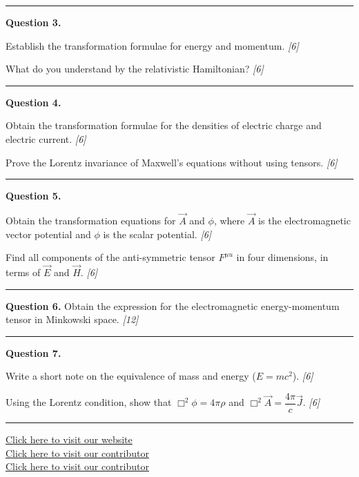 \documentclass[11pt,a4paper]{article}
\newcommand{\pts}[1]{\hfill   \textit{[#1]}}
\begin{document}
\medskip\rule{\linewidth}{0.2pt}

\medskip


\noindent   \textbf{Question 3.}

\begin{parts}
  \item Establish the transformation formulae for energy and momentum. \pts{6}
  \item What do you understand by the relativistic Hamiltonian? \pts{6}
\end{parts}

\medskip\rule{\linewidth}{0.2pt}

\medskip


\noindent   \textbf{Question 4.}

\begin{parts}
  \item Obtain the transformation formulae for the densities of electric charge and electric current. \pts{6}
  \item Prove the Lorentz invariance of Maxwell's equations without using tensors. \pts{6}
\end{parts}

\medskip\rule{\linewidth}{0.2pt}

\medskip


\noindent   \textbf{Question 5.}

\begin{parts}
  \item Obtain the transformation equations for $\vec{A}$ and $\phi$, where $\vec{A}$ is the electromagnetic vector potential and $\phi$ is the scalar potential. \pts{6}
  \item Find all components of the anti-symmetric tensor $F^{\mu
u}$ in four dimensions, in terms of $\vec{E}$ and $\vec{H}$. \pts{6}
\end{parts}

\medskip\rule{\linewidth}{0.2pt}

\medskip


\noindent   \textbf{Question 6.}
Obtain the expression for the electromagnetic energy-momentum tensor in Minkowski space. \pts{12}

\medskip\rule{\linewidth}{0.2pt}

\medskip


\noindent   \textbf{Question 7.}

\begin{parts}
  \item Write a short note on the equivalence of mass and energy ($E = mc^2$). \pts{6}
  \item Using the Lorentz condition, show that $\Box^2 \phi = 4\pi\rho$ and $\Box^2 \vec{A} = \dfrac{4\pi}{c}\vec{J}$. \pts{6}
\end{parts}

\vfill\rule{\linewidth}{0.4pt}

\begin{center}\small
  \href{https://bhu-exam.vercel.app/}{Click here to visit our website}\\[4pt]
  \href{https://me-aryan.vercel.app/}{Click here to visit our contributor}\\[4pt]
  \href{https://quashan-me.vercel.app/}{Click here to visit our contributor}
\end{center}
\end{document}
